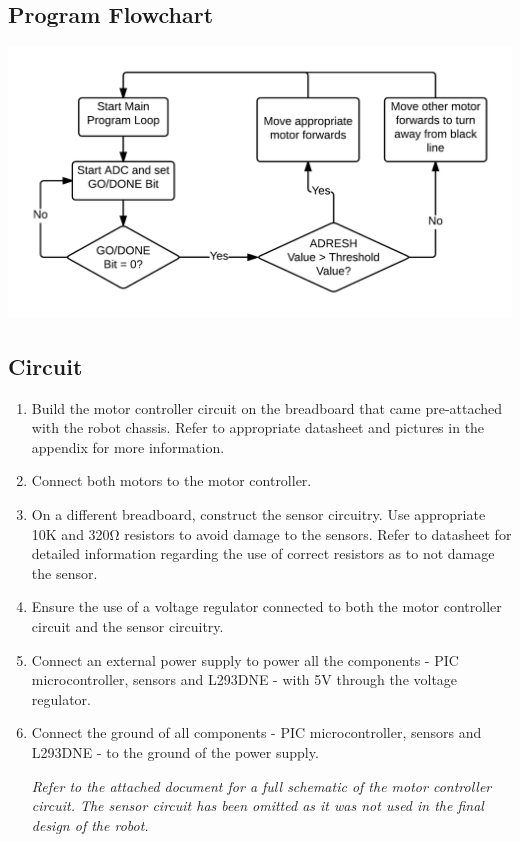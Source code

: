 \documentclass[12pt]{article}
\begin{document}
\subsection{Program Flowchart}
\includegraphics{ProgramFlowchart}
\subsection{Circuit}
\begin{enumerate}
	\item Build the motor controller circuit on the breadboard that came pre-attached with the robot chassis. Refer to appropriate datasheet and pictures in the appendix for more information.
	\item Connect both motors to the motor controller.
	\item On a different breadboard, construct the sensor circuitry. Use appropriate 10K and 320Ω resistors to avoid damage to the sensors. Refer to datasheet for detailed information regarding the use of correct resistors as to not damage the sensor.
	\item Ensure the use of a voltage regulator connected to both the motor controller circuit and the sensor circuitry.
	\item Connect an external power supply to power all the components - PIC microcontroller, sensors and L293DNE - with 5V through the voltage regulator.
	\item Connect the ground of all components - PIC microcontroller, sensors and L293DNE - to the ground of the power supply. 
	
	\textit{Refer to the attached document for a full schematic of the motor controller circuit. The sensor circuit has been omitted as it was not used in the final design of the robot.}
\end{enumerate}
\end{document}
